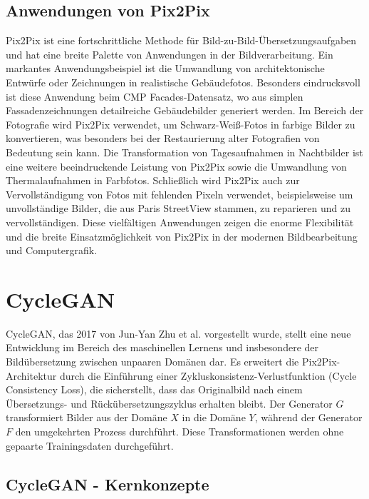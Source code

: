 \subsection{Anwendungen von Pix2Pix}
Pix2Pix ist eine fortschrittliche Methode für Bild-zu-Bild-Übersetzungsaufgaben und hat eine breite Palette von Anwendungen in der Bildverarbeitung.\newline
Ein markantes Anwendungsbeispiel ist die Umwandlung von architektonische Entwürfe oder Zeichnungen in realistische Gebäudefotos. Besonders eindrucksvoll ist diese Anwendung beim CMP Facades-Datensatz, wo aus simplen Fassadenzeichnungen detailreiche Gebäudebilder generiert werden. \cite{PhillipIsola.}
\newline
Im Bereich der Fotografie wird Pix2Pix verwendet, um Schwarz-Weiß-Fotos in farbige Bilder zu konvertieren, was besonders bei der Restaurierung alter Fotografien von Bedeutung sein kann.
\newline
Die Transformation von Tagesaufnahmen in Nachtbilder ist eine weitere beeindruckende Leistung von Pix2Pix sowie die Umwandlung von Thermalaufnahmen in Farbfotos.
\newline
Schließlich wird Pix2Pix auch zur Vervollständigung von Fotos mit fehlenden Pixeln verwendet, beispielsweise um unvollständige Bilder, die aus Paris StreetView stammen, zu reparieren und zu vervollständigen.
\newline
Diese vielfältigen Anwendungen zeigen die enorme Flexibilität und die breite Einsatzmöglichkeit von Pix2Pix in der modernen Bildbearbeitung und Computergrafik.
 

\section{CycleGAN}
CycleGAN, das 2017 von Jun-Yan Zhu et al. vorgestellt wurde, stellt eine neue Entwicklung im Bereich des maschinellen Lernens und insbesondere der Bildübersetzung zwischen unpaaren Domänen dar. Es erweitert die Pix2Pix-Architektur durch die Einführung einer Zykluskonsistenz-Verlustfunktion (Cycle Consistency Loss), die sicherstellt, dass das Originalbild nach einem Übersetzungs- und Rückübersetzungszyklus erhalten bleibt. Der Generator $G$ transformiert Bilder aus der Domäne $X$ in die Domäne $Y$, während der Generator $F$ den umgekehrten Prozess durchführt. Diese Transformationen werden ohne gepaarte Trainingsdaten durchgeführt.

\subsection{CycleGAN - Kernkonzepte}


